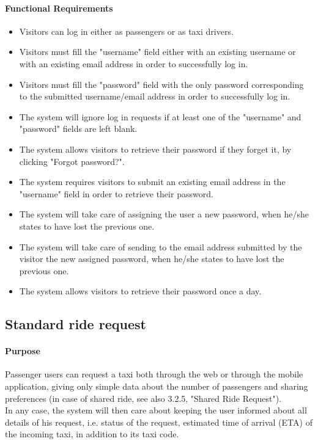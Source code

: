 	\paragraph{Functional Requirements}
		\begin{itemize}
			\item Visitors can log in either as passengers or as taxi drivers.
			\item Visitors must fill the "username" field either with an existing username or with an existing email address in order to successfully log in.
			\item Visitors must fill the "password" field with the only password corresponding to the submitted username/email address in order to successfully log in.
			\item The system will ignore log in requests if at least one of the "username" and "password" fields are left blank.
			\item The system allows visitors to retrieve their password if they forget it, by clicking "Forgot password?".
			\item The system requires visitors to submit an existing email address in the "username" field in order to retrieve their password.
			\item The system will take care of assigning the user a new password, when he/she states to have lost the previous one.
			\item The system will take care of sending to the email address submitted by the visitor the new assigned password, when he/she states to have lost the previous one.
			\item The system allows visitors to retrieve their password once a day.
		\end{itemize}
	
\subsection{Standard ride request}
	\paragraph{Purpose}
		Passenger users can request a taxi both through the web or through the mobile application, giving only simple data about the number of passengers and sharing preferences (in case of shared ride, see also 3.2.5, "Shared Ride Request").\\
		In any case, the system will then care about keeping the user informed about all details of his request, i.e. status of the request, estimated time of arrival (ETA) of the incoming taxi, in addition to its taxi code.
	
